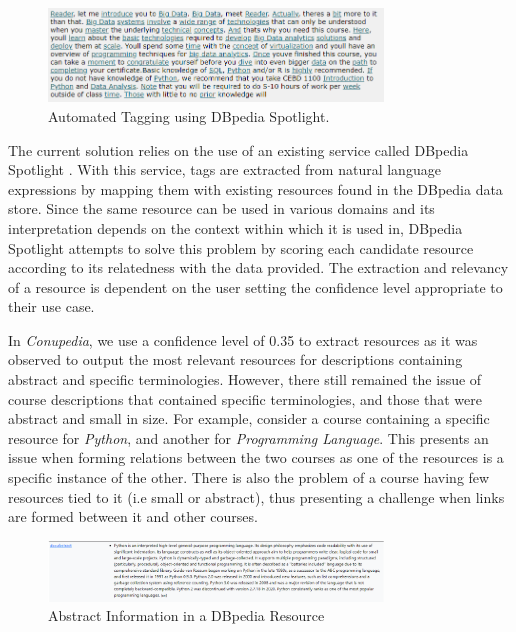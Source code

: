 \documentclass[conference]{IEEEtran}
\begin{document}
            
            \begin{figure}[htbp]
            \centering
            \includegraphics[width=3.5in]{img/dbpedia-spotlight.png}
            \caption{Automated Tagging using DBpedia Spotlight.}
            \label{fig_sim}
            \end{figure}

            
            The current solution relies on the use of an existing service called DBpedia Spotlight \cite{b3}.
            With this service, tags are extracted from natural language expressions by mapping them with existing resources found in the DBpedia data store.
            Since the same resource can be used in various domains and its interpretation depends on the context within which it is used in,  DBpedia Spotlight attempts to solve this problem by scoring each candidate resource according to its relatedness with the data provided.
            The extraction and relevancy of a resource is dependent on the user setting the confidence level appropriate to their use case.
            
            In \textit{Conupedia}, we use a confidence level of 0.35 to extract resources as it was observed to output the most relevant resources for descriptions containing abstract and specific terminologies.
            However, there still remained the issue of course descriptions that contained specific terminologies, and those that were abstract and small in size. 
            For example, consider a course containing a specific resource for \textit{Python}, and another for \textit{Programming Language}.
            This presents an issue when forming relations between the two courses as one of the resources is a specific instance of the other.
            There is also the problem of a course having few resources tied to it (i.e small or abstract), thus presenting a challenge when links are formed between it and other courses.
            
            \begin{figure}[htbp]
            \centering
            \includegraphics[width=3.5in]{img/python.png}
            \caption{Abstract Information in a DBpedia Resource}
            \label{abstract_info}
            \end{figure}
            
\end{document}
